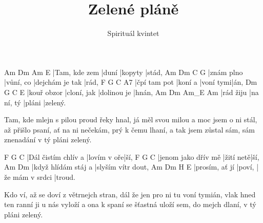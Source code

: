 \documentclass{song}
\title{Zelené pláně}
\author{Spirituál kvintet}
\begin{document}
\strophe
Am            Dm    Am      E
|Tam, kde zem |duní |kopyty |stád,
Am         Dm        C               G
|znám plno |vůní, co |dejchám je tak |rád,
F            G       C         A7
|čpí tam pot |koní a |voní tymi|án,
Dm          G           C           E
|kouř obzor |cloní, jak |dolinou je |hnán,
Am        Dm         Am_E   Am
|rád žiju |na ní, tý |pláni |zelený.
\endstrophe

\strophe*
Tam, kde mlejn s pilou proud řeky hnal,
já měl svou milou a moc jsem o ni stál,
až přišlo psaní, ať na ni nečekám,
prý k čemu lhaní, a tak jsem zůstal sám,
sám znenadání v tý pláni zelený.
\endstrophe

\strophe
F                   G           C
|Dál čistím chlív a |lovím v oře|ší,
F                   G         C
|jenom jako dřív mě |žití netě|ší,
Am                  Dm
|když hlídám stáj a |slyším vítr dout,
Am             Dm     H               E
|prosím, ať jí |poví, |že mám v srdci |troud.
\endstrophe

\strophe*
Kdo ví, až se doví z větrnejch stran,
dál že jen pro ni tu voní tymián,
vlak hned ten ranní ji u nás vyloží
a ona k spaní se šťastná uloží
sem, do mejch dlaní, v tý pláni zelený.
\endstrophe
\end{document}
